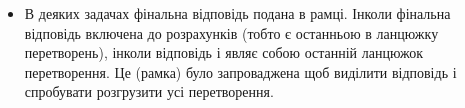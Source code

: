 \begin{itemize}
  \item В деяких задачах фінальна відповідь подана в рамці. Інколи фінальна відповідь включена до розрахунків (тобто є останньою в ланцюжку перетворень), інколи відповідь і являє собою останній ланцюжок перетворення. Це (рамка) було запроваджена щоб виділити відповідь і спробувати розгрузити усі перетворення.
\end{itemize}
